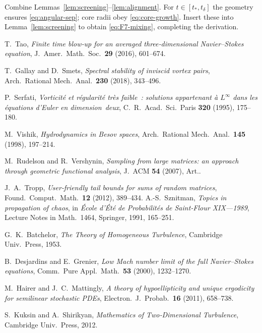 \documentclass[11pt]{article}
\theoremstyle{definition}
\theoremstyle{remark}
\begin{document}
Combine Lemmas~\ref{lem:screening}–\ref{lem:alignment}.
For $t\in[t_*,t_\delta]$ the geometry ensures
\eqref{eq:angular-sep}; core radii obey \eqref{eq:core-growth}.
Insert these into Lemma~\ref{lem:screening} to obtain
\eqref{eq:F7-mixing}, completing the derivation.

\begin{thebibliography}{99}

T.~Tao, \emph{Finite time blow‑up for an averaged three‑dimensional Navier--Stokes equation},
J.\ Amer.\ Math.\ Soc.\ \textbf{29} (2016), 601--674.

T.~Gallay and D.~Smets, \emph{Spectral stability of inviscid vortex pairs},
Arch.\ Rational Mech.\ Anal.\ \textbf{230} (2018), 343--496.

P.~Serfati, \emph{Vorticité et régularité très faible : solutions appartenant à $L^\infty$ dans les équations d’Euler en dimension deux},
C.~R.\ Acad.\ Sci.\ Paris \textbf{320} (1995), 175--180.

M.~Vishik, \emph{Hydrodynamics in Besov spaces},
Arch.\ Rational Mech.\ Anal.\ \textbf{145} (1998), 197--214.

M.~Rudelson and R.~Vershynin, \emph{Sampling from large matrices: an approach through geometric functional analysis},
J.\ ACM \textbf{54} (2007), Art..

J.~A.~Tropp, \emph{User‑friendly tail bounds for sums of random matrices},
Found.\ Comput.\ Math.\ \textbf{12} (2012), 389--434.
A.-S.~Sznitman, \emph{Topics in propagation of chaos}, 
in \emph{École d’Été de Probabilités de Saint‑Flour XIX—1989},
Lecture Notes in Math.\ 1464, Springer, 1991, 165–251.

G.~K.~Batchelor, \emph{The Theory of Homogeneous Turbulence}, Cambridge Univ.\ Press, 1953.

B.~Desjardins and E.~Grenier, \emph{Low Mach number limit of the full Navier–Stokes equations},
Comm.\ Pure Appl.\ Math.\ \textbf{53} (2000), 1232–1270.

M.~Hairer and J.~C.~Mattingly, \emph{A theory of hypoellipticity and unique ergodicity for semilinear stochastic PDEs},
Electron.\ J.\ Probab.\ \textbf{16} (2011), 658–738.

S.~Kuksin and A.~Shirikyan, \emph{Mathematics of Two‑Dimensional Turbulence}, Cambridge Univ.\ Press, 2012.

\end{thebibliography}
\end{document}

